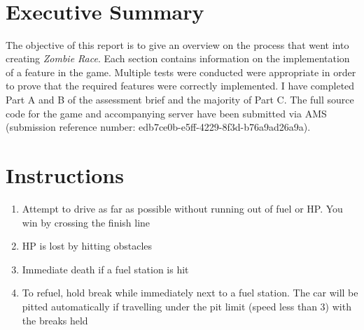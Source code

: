 \documentclass{article}
\title{
\vspace{2in}
\textmd{\huge\textbf{\Class}}\\
\textmd{{\Title}}\\
\vspace{3in}
\textmd{{\AuthorName}}\\
}
\begin{document}
\maketitle
\clearpage

\section*{Executive Summary}
The objective of this report is to give an overview on the process that went into creating \emph{Zombie Race}. Each section contains information on the implementation of a feature in the game. Multiple tests were conducted were appropriate in order to prove that the required features were correctly implemented.
\newline
\newline
I have completed Part A and B of the assessment brief and the majority of Part C. The full source code for the game and accompanying server have been submitted via AMS (submission reference number: edb7ce0b-e5ff-4229-8f3d-b76a9ad26a9a).

\clearpage



\newpage
\tableofcontents
\newpage

\section{Instructions}
\begin{enumerate}
	\item Attempt to drive as far as possible without running out of fuel or HP. You win by crossing the finish line
	\item HP is lost by hitting obstacles
	\item Immediate death if a fuel station is hit
	\item To refuel, hold break while immediately next to a fuel station. The car will be pitted automatically if travelling under the pit limit (speed less than 3) with the breaks held
\end{enumerate}
\end{document}
